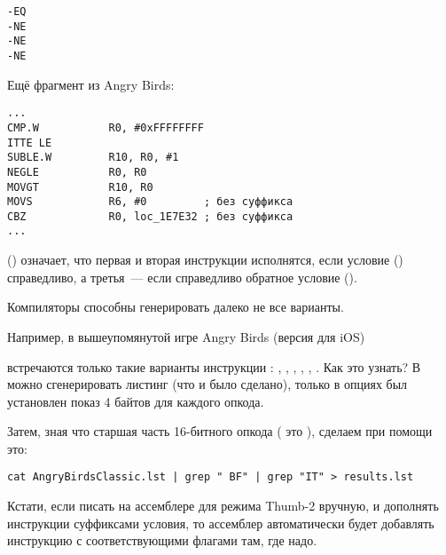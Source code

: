 \begin{lstlisting}
-EQ
-NE
-NE
-NE
\end{lstlisting}

Ещё фрагмент из Angry Birds:

\begin{lstlisting}[caption=Angry Birds Classic]
...
CMP.W           R0, #0xFFFFFFFF
ITTE LE
SUBLE.W         R10, R0, #1
NEGLE           R0, R0
MOVGT           R10, R0
MOVS            R6, #0         ; без суффикса
CBZ             R0, loc_1E7E32 ; без суффикса
...
\end{lstlisting}

 () 
означает, что первая и вторая инструкции исполнятся, если условие  ()
справедливо, а третья~--- если справедливо обратное условие (\EMDASH{}).

Компиляторы способны генерировать далеко не все варианты.

Например, в вышеупомянутой игре Angry Birds (версия  для iOS)

встречаются только такие варианты инструкции : 
, , , , , .
\myindex{\GrepUsage}
Как это узнать?
В \IDA можно сгенерировать листинг (что и было сделано), только в опциях был установлен показ 4 байтов для каждого опкода.

Затем, зная что старшая часть 16-битного опкода ( это ), сделаем при помощи  это:

\begin{lstlisting}
cat AngryBirdsClassic.lst | grep " BF" | grep "IT" > results.lst
\end{lstlisting}

Кстати, если писать на ассемблере для режима Thumb-2 вручную, и дополнять инструкции суффиксами
условия, то ассемблер автоматически будет добавлять инструкцию  с соответствующими флагами там,
где надо.

\myparagraph{\NonOptimizingXcodeIV (\ARMMode)}

